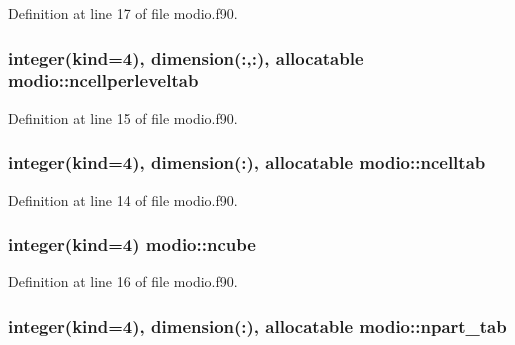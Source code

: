 Definition at line 17 of file modio.\+f90.

\subsubsection[{\texorpdfstring{ncellperleveltab}{ncellperleveltab}}]{\setlength{\rightskip}{0pt plus 5cm}integer(kind=4), dimension(\+:,\+:), allocatable modio\+::ncellperleveltab}\hypertarget{namespacemodio_a541838a88faeed3af974f875bd73ee00}{}\label{namespacemodio_a541838a88faeed3af974f875bd73ee00}


Definition at line 15 of file modio.\+f90.

\subsubsection[{\texorpdfstring{ncelltab}{ncelltab}}]{\setlength{\rightskip}{0pt plus 5cm}integer(kind=4), dimension(\+:), allocatable modio\+::ncelltab}\hypertarget{namespacemodio_a0a0852674d63f2d9f6c23969d3f7016c}{}\label{namespacemodio_a0a0852674d63f2d9f6c23969d3f7016c}


Definition at line 14 of file modio.\+f90.

\subsubsection[{\texorpdfstring{ncube}{ncube}}]{\setlength{\rightskip}{0pt plus 5cm}integer(kind=4) modio\+::ncube}\hypertarget{namespacemodio_af7ac0e60c49f16bf08605237dd728508}{}\label{namespacemodio_af7ac0e60c49f16bf08605237dd728508}


Definition at line 16 of file modio.\+f90.

\subsubsection[{\texorpdfstring{npart\+\_\+tab}{npart_tab}}]{\setlength{\rightskip}{0pt plus 5cm}integer(kind=4), dimension(\+:), allocatable modio\+::npart\+\_\+tab}\hypertarget{namespacemodio_a0bb05c9005df17b314c2a7e0f43e758c}{}\label{namespacemodio_a0bb05c9005df17b314c2a7e0f43e758c}


